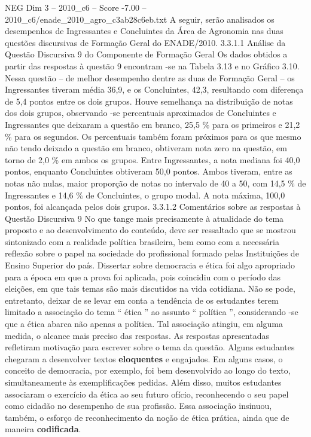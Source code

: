 \begin{textsample}{NEG Dim 3 – 2010\_c6 – Score -7.00 – 2010\_c6/enade\_2010\_agro\_c3ab28c6eb.txt}
A seguir, serão analisados os desempenhos de Ingressantes e Concluintes da Área de Agronomia nas duas questões discursivas de Formação Geral do ENADE/2010. 3.3.1.1 Análise da Questão Discursiva 9 do Componente de Formação Geral Os dados obtidos a partir das respostas à questão 9 encontram -se na Tabela 3.13 e no Gráfico 3.10.
Nessa questão – de melhor desempenho dentre as duas de Formação Geral – os Ingressantes tiveram média 36,9, e os Concluintes, 42,3, resultando com diferença de 5,4 pontos entre os dois grupos.
Houve semelhança na distribuição de notas dos dois grupos, observando -se percentuais aproximados de Concluintes e Ingressantes que deixaram a questão em branco, 25,5 \% para os primeiros e 21,2 \% para os segundos.
Os percentuais também foram próximos para os que mesmo não tendo deixado a questão em branco, obtiveram nota zero na questão, em torno de 2,0 \% em ambos os grupos.
Entre Ingressantes, a nota mediana foi 40,0 pontos, enquanto Concluintes obtiveram 50,0 pontos.
Ambos tiveram, entre as notas não nulas, maior proporção de notas no intervalo de 40 a 50, com 14,5 \% de Ingressantes e 14,6 \% de Concluintes, o grupo modal.
A nota máxima, 100,0 pontos, foi alcançada pelos dois grupos. 3.3.1.2 Comentários sobre as respostas à Questão Discursiva 9 No que tange mais precisamente à atualidade do tema proposto e ao desenvolvimento do conteúdo, deve ser ressaltado que se mostrou sintonizado com a realidade política brasileira, bem como com a necessária reflexão sobre o papel na sociedade do profissional formado pelas Instituições de Ensino Superior do país.
Dissertar sobre democracia e ética foi algo apropriado para a época em que a prova foi aplicada, pois coincidiu com o período das eleições, em que tais temas são mais discutidos na vida cotidiana.
Não se pode, entretanto, deixar de se levar em conta a tendência de os estudantes terem limitado a associação do tema “ ética ” ao assunto “ política ”, considerando -se que a ética abarca não apenas a política.
Tal associação atingiu, em alguma medida, o alcance mais preciso das respostas.
As respostas apresentadas refletiram motivação para escrever sobre o tema da questão.
Alguns estudantes chegaram a desenvolver textos \textbf{eloquentes} e engajados.
Em alguns casos, o conceito de democracia, por exemplo, foi bem desenvolvido ao longo do texto, simultaneamente às exemplificações pedidas.
Além disso, muitos estudantes associaram o exercício da ética ao seu futuro ofício, reconhecendo o seu papel como cidadão no desempenho de sua profissão.
Essa associação insinuou, também, o esforço de reconhecimento da noção de ética prática, ainda que de maneira \textbf{codificada}.

\end{textsample}
